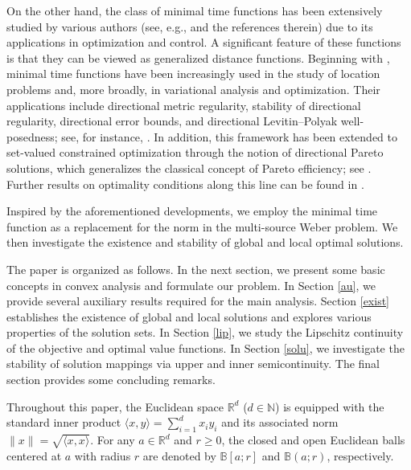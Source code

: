 \documentclass[sn-mathphys-num]{sn-jnl}%
\theoremstyle{definition}
\begin{document}
On the other hand, the class of minimal time functions has been extensively studied by various authors (see, e.g., \cite{
	colombo2004subgradient,colombo2010well,durea2016minimal,he2006subdifferentials,jiang2012subdifferential,mordukhovich2010limiting,mordukhovich2011subgradients,wolenski1998proximal} and the references therein) due to its applications in optimization and control. A significant feature of these functions is that they can be viewed as generalized distance functions. Beginning with \cite{nam2013variational}, minimal time functions have been increasingly used in the study of location problems and, more broadly, in variational analysis and optimization. Their applications include directional metric regularity, stability of directional regularity, directional error bounds, and directional Levitin--Polyak well-posedness; see, for instance, \cite{burlicua2023directional,cibulka2020stability,durea2017new}. In addition, this framework has been extended to set-valued constrained optimization through the notion of directional Pareto solutions, which generalizes the classical concept of Pareto efficiency; see \cite{chelmucs2019directional,chelmucs2021stability,cibulka2020stability,chelmus2022exact}. Further results on optimality conditions along this line can be found in \cite{ait2022strict}.

Inspired by the aforementioned developments, we employ the minimal time function as a replacement for the norm in the multi-source Weber problem. We then investigate the existence and stability of global and local optimal solutions.

The paper is organized as follows. In the next section, we present some basic concepts in convex analysis and formulate our problem. In Section \ref{au}, we provide several auxiliary results required for the main analysis. Section \ref{exist} establishes the existence of global and local solutions and explores various properties of the solution sets. In Section \ref{lip}, we study the Lipschitz continuity of the objective and optimal value functions. In Section \ref{solu}, we investigate the stability of solution mappings via upper and inner semicontinuity. The final section provides some concluding remarks.  

Throughout this paper, the Euclidean space $\mathbb{R}^d$ ($d \in \mathbb{N}$) is equipped with the standard inner product $\langle x, y \rangle = \sum_{i=1}^{d} x_i y_i$ and its associated norm $\|x\| = \sqrt{\langle x, x \rangle}$. For any $a \in \mathbb{R}^d$ and $r \geq 0$, the closed and open Euclidean balls centered at $a$ with radius $r$ are denoted by $\mathbb{B}[a; r]$ and $\mathbb{B}(a; r)$, respectively.
\end{document}
